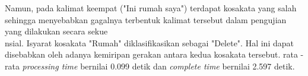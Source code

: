 Namun, pada kalimat keempat ("Ini rumah saya") terdapat kosakata yang salah sehingga menyebabkan gagalnya terbentuk kalimat tersebut dalam pengujian yang dilakukan secara sekue\\nsial. Isyarat kosakata "Rumah" diklasifikasikan sebagai "Delete". Hal ini dapat disebabkan oleh adanya kemiripan gerakan antara kedua kosakata tersebut. rata - rata \emph{processing time} bernilai 0.099 detik dan \emph{complete time} bernilai 2.597 detik.  








